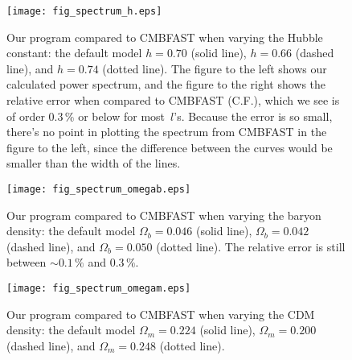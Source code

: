 \documentclass[twocolumn,nofootinbib,amsmath,amssymb]{revtex4}
\begin{document}
\begin{widetext}
\begin{figure}[!h]
  \begin{center}
    \texttt{[image: fig\_spectrum\_h.eps]}
  \end{center}
  \vspace{-6mm}
  \caption{Our program compared to CMBFAST when varying the Hubble constant:
  the default model $h=0.70$ (solid line), $h=0.66$ (dashed line), and $h=0.74$
  (dotted line). The figure to the left shows our calculated power spectrum,
  and the figure to the right shows the relative error when compared to CMBFAST
  (C.F.), which we see is of order $0.3 \,\%$ or below for most~$l$'s. Because
  the error is so small, there's no point in plotting the spectrum from CMBFAST
  in the figure to the left, since the difference between the curves would be
  smaller than the width of the lines.}
  \label{fig:powerspectrum1}
\end{figure}
\begin{figure}[!h]
  \begin{center}
    \texttt{[image: fig\_spectrum\_omegab.eps]}
  \end{center}
  \vspace{-6mm}
  \caption{Our program compared to CMBFAST when varying the baryon density: the
  default model $\Omega_b = 0.046$ (solid line), $\Omega_b = 0.042$ (dashed
  line), and $\Omega_b = 0.050$ (dotted line). The relative error is still
  between $\sim 0.1 \,\%$ and $0.3 \,\%$.}
  \label{fig:powerspectrum2}
\end{figure}
\begin{figure}[!h]
  \begin{center}
    \texttt{[image: fig\_spectrum\_omegam.eps]}
  \end{center}
  \vspace{-6mm}
  \caption{Our program compared to CMBFAST when varying the CDM density: the
  default model $\Omega_m = 0.224$ (solid line), $\Omega_m = 0.200$ (dashed
  line), and $\Omega_m = 0.248$ (dotted line).}
  \label{fig:powerspectrum3}
\end{figure}

\clearpage


\end{widetext}
\end{document}
